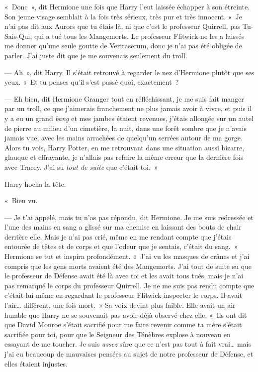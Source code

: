 «~Donc~», dit Hermione une fois que Harry l'eut laissée échapper à son étreinte. Son jeune visage semblait à la fois très sérieux, très pur et très innocent. «~Je n'ai pas dit aux Aurors que tu étais là, ni que c'est le professeur Quirrell, pas Tu-Sais-Qui, qui a tué tous les Mangemorts. Le professeur Flitwick ne les a laissés me donner qu'une seule goutte de Veritaserum, donc je n'ai pas été obligée de parler. J'ai juste dit que je me souvenais seulement du troll.

--- Ah~», dit Harry. Il s'était retrouvé à regarder le nez d'Hermione plutôt que ses yeux. «~Et tu penses qu'il s'est passé quoi, exactement~?

--- Eh bien, dit Hermione Granger tout en réfléchissant, je me suis fait manger par un troll, ce que j'aimerais franchement ne plus jamais avoir à vivre, et puis il y a eu un grand \emph{bang} et mes jambes étaient revenues, j'étais allongée sur un autel de pierre au milieu d'un cimetière, la nuit, dans une forêt sombre que je n'avais jamais vue, avec les mains arrachées de quelqu'un serrées autour de ma gorge. Alors tu vois, Harry Potter, en me retrouvant dans une situation aussi bizarre, glauque et effrayante, je n'allais pas refaire la même erreur que la dernière fois avec Tracey. J'ai su \emph{tout de suite} que c'était toi.~»

Harry hocha la tête.

«~Bien vu.

--- Je t'ai appelé, mais tu n'as pas répondu, dit Hermione. Je me suis redressée et l'une des mains en sang a glissé sur ma chemise en laissant des bouts de chair derrière elle. Mais je n'ai pas crié, même en me rendant compte que j'étais entourée de têtes et de corps et que l'odeur que je sentais, c'était du sang.~» Hermione se tut et inspira profondément. «~J'ai vu les masques de crânes et j'ai compris que les gens morts avaient été des Mangemorts. J'ai tout de suite su que le professeur de Défense avait été là avec toi et les avait tous tués, mais je n'ai pas remarqué le corps du professeur Quirrell. Je ne me suis pas rendu compte que c'était lui-même en regardant le professeur Flitwick inspecter le corps. Il avait l'air… différent, une fois mort.~» Sa voix devint plus faible. Elle avait un air humble que Harry ne se souvenait pas avoir déjà observé chez elle. «~Ils ont dit que David Monroe s'était sacrifié pour me faire revenir comme ta mère s'était sacrifiée pour toi, pour que le Seigneur des Ténèbres explose à nouveau en essayant de me toucher. Je suis \emph{assez} sûre que ce n'est pas tout à fait vrai… mais j'ai eu beaucoup de mauvaises pensées au sujet de notre professeur de Défense, et elles étaient injustes.

